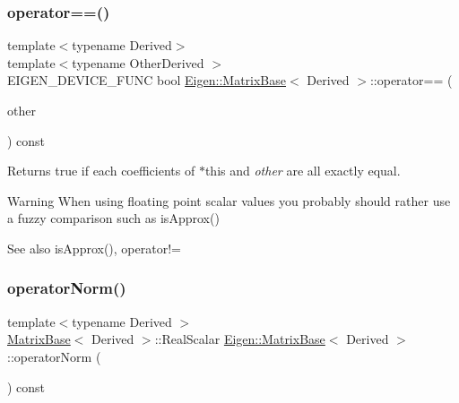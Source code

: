 \subsubsection{\texorpdfstring{operator==()}{operator==()}}
{\footnotesize\ttfamily template$<$typename Derived$>$ \\
template$<$typename Other\+Derived $>$ \\
E\+I\+G\+E\+N\+\_\+\+D\+E\+V\+I\+C\+E\+\_\+\+F\+U\+NC bool \mbox{\hyperlink{class_eigen_1_1_matrix_base}{Eigen\+::\+Matrix\+Base}}$<$ Derived $>$\+::operator== (\begin{DoxyParamCaption}\item[{const \mbox{\hyperlink{class_eigen_1_1_matrix_base}{Matrix\+Base}}$<$ Other\+Derived $>$ \&}]{other }\end{DoxyParamCaption}) const\hspace{0.3cm}{\ttfamily [inline]}}

\begin{DoxyReturn}{Returns}
true if each coefficients of {\ttfamily $\ast$this} and {\itshape other} are all exactly equal. 
\end{DoxyReturn}
\begin{DoxyWarning}{Warning}
When using floating point scalar values you probably should rather use a fuzzy comparison such as is\+Approx() 
\end{DoxyWarning}
\begin{DoxySeeAlso}{See also}
is\+Approx(), operator!= 
\end{DoxySeeAlso}
\mbox{\label{class_eigen_1_1_matrix_base_a0ff9bc0b9bea2d0822a2bf3192783102}} 
\subsubsection{\texorpdfstring{operatorNorm()}{operatorNorm()}}
{\footnotesize\ttfamily template$<$typename Derived $>$ \\
\mbox{\hyperlink{class_eigen_1_1_matrix_base}{Matrix\+Base}}$<$ Derived $>$\+::Real\+Scalar \mbox{\hyperlink{class_eigen_1_1_matrix_base}{Eigen\+::\+Matrix\+Base}}$<$ Derived $>$\+::operator\+Norm (\begin{DoxyParamCaption}{ }\end{DoxyParamCaption}) const\hspace{0.3cm}{\ttfamily [inline]}}




